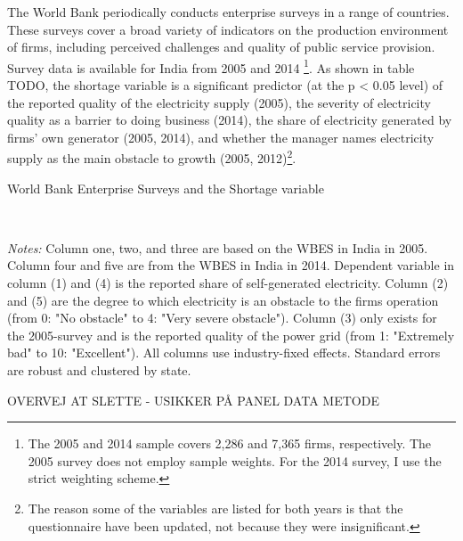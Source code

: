 \documentclass[11pt]{article}
\begin{document}
The World Bank periodically conducts enterprise surveys in a range of countries. These surveys cover a broad variety of indicators on the production environment of firms, including perceived challenges and quality of public service provision. Survey data is available for India from 2005 and 2014 \citep{world_bank_enterprise_2020-1,world_bank_enterprise_2020-2}\footnote{The 2005 and 2014 sample covers 2,286 and 7,365 firms, respectively. The 2005 survey does not employ sample weights. For the 2014 survey, I use the strict weighting scheme.}. As shown in table TODO, the shortage variable is a significant predictor (at the p < 0.05 level) of the reported quality of the electricity supply (2005), the severity of electricity quality as a barrier to doing business (2014), the share of electricity generated by firms' own generator (2005, 2014), and whether the manager names electricity supply as the main obstacle to growth (2005, 2012)\footnote{The reason some of the variables are listed for both years is that the questionnaire have been updated, not because they were insignificant.}.

\begin{table}
    \caption{World Bank Enterprise Surveys and the Shortage variable}
    \label{tab:wbes}
    \begin{minipage}{0.95\textwidth} 

    \\
    { \footnotesize \textit{Notes:} Column one, two, and three are based on the WBES in India in 2005. Column four and five are from the WBES in India in 2014. Dependent variable in column (1) and (4) is the reported share of self-generated electricity. Column (2) and (5) are the degree to which electricity is an obstacle to the firms operation (from 0: "No obstacle" to 4: "Very severe obstacle"). Column (3) only exists for the 2005-survey and is the reported quality of the power grid (from 1: "Extremely bad" to 10: "Excellent"). All columns use industry-fixed effects. Standard errors are robust and clustered by state. \\
\par}
    \end{minipage}
\end{table}   

% 


% 

OVERVEJ AT SLETTE - USIKKER PÅ PANEL DATA METODE
\end{document}
